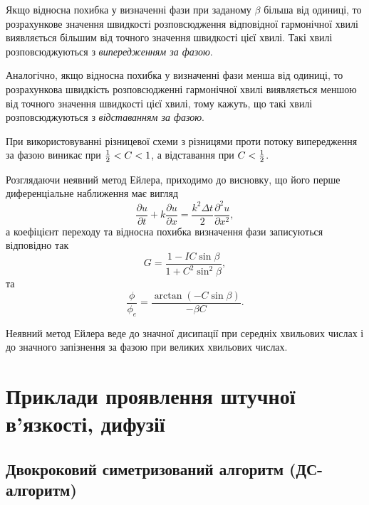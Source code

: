 Якщо відносна похибка у визначенні фази при заданому $\beta$ більша від одиниці, то розрахункове значення швидкості розповсюдження відповідної гармонічної хвилі виявляється більшим від точного значення швидкості цієї хвилі. Такі хвилі розповсюджуються з \emph{випередженням за фазою}. \medskip

Аналогічно, якщо відносна похибка у визначенні фази менша від одиниці, то розрахункова швидкість розповсюдженні гармонічної хвилі виявляється меншою від точного значення швидкості цієї хвилі, тому кажуть, що такі хвилі розповсюджуються з \emph{відставанням за фазою}. \medskip

При використовуванні різницевої схеми з різницями проти потоку випередження за фазою виникає при $\frac{1}{2} < C < 1$, а відставання при $C < \frac{1}{2}$. \medskip

Розглядаючи неявний метод Ейлера, приходимо до висновку, що його перше диференціальне наближення має вигляд
\begin{equation*}
    \frac{\partial u}{\partial t} + k \frac{\partial u}{\partial x} = \frac{k^2 \Delta t}{2} \frac{\partial^2 u}{\partial x^2},
\end{equation*}
а коефіцієнт переходу та відносна похибка визначення фази записуються відповідно так
\begin{equation*}
    G = \frac{1 - I C \sin \beta}{1 + C^2 \sin^2 \beta},
\end{equation*}
та
\begin{equation*}
    \frac{\phi}{\phi_e} = \frac{\arctan(- C \sin \beta)}{-\beta C}.
\end{equation*}

Неявний метод Ейлера веде до значної дисипації при середніх хвильових числах і до значного запізнення за фазою при великих хвильових числах.

\section{Приклади проявлення штучної в'язкості, дифузії}

\subsection{Двокроковий симетризований алгоритм (ДС-алгоритм)}

